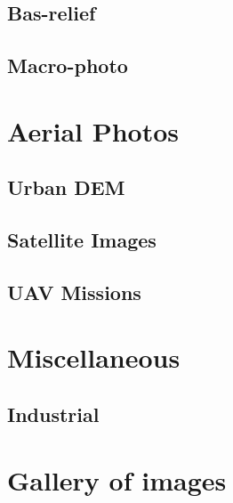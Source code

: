 \subsection{Bas-relief}
\subsection{Macro-photo}


\section{Aerial Photos}

\subsection{Urban DEM}
\subsection{Satellite Images}
\subsection{UAV Missions}


\section{Miscellaneous}
\subsection{Industrial}


\section{Gallery of images}

\newpage




